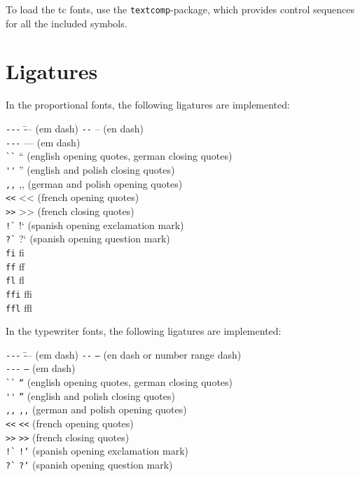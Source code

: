 \documentclass{article}
\renewcommand{\-}{\discretionary{\char'0177 }{}{}}
\begin{document}
To load the \textsf{tc} fonts, use the \texttt{textcomp}-package, which 
provides control sequences for all the included symbols.

\section{Ligatures}
In the proportional fonts, the following ligatures are implemented:\\
\begin{tabbing}
\verb:---: \=--- (em dash) \kill
\verb:--:  \>-- (en dash)\\
\verb:---: \>--- (em dash)\\
\verb:``:  \>`` (english opening quotes, german closing quotes)\\
\verb:'':  \>'' (english and polish closing quotes)\\
\verb:,,:  \>,, (german and polish opening quotes)\\
\verb:<<:  \><< (french opening quotes)\\
\verb:>>:  \>>> (french closing quotes)\\
\verb:!`:  \>!` (spanish opening exclamation mark)\\
\verb:?`:  \>?` (spanish opening question mark)\\
\verb:fi:  \>fi\\
\verb:ff:  \>ff\\
\verb:fl:  \>fl\\
\verb:ffi: \>ffi\\
\verb:ffl: \>ffl
\end{tabbing}

In the typewriter fonts, the following ligatures are implemented:
\begin{tabbing}
\verb:---: \=--- (em dash) \kill
\verb:--:  \>\texttt{--} (en dash or number range dash)\\
\verb:---: \>\texttt{---} (em dash)\\
\verb:``:  \>\texttt{``} (english opening quotes, german closing quotes)\\
\verb:'':  \>\texttt{''} (english and polish closing quotes)\\
\verb:,,:  \>\texttt{,,} (german and polish opening quotes)\\
\verb:<<:  \>\texttt{<<} (french opening quotes)\\
\verb:>>:  \>\texttt{>>} (french closing quotes)\\
\verb:!`:  \>\texttt{!`} (spanish opening exclamation mark)\\
\verb:?`:  \>\texttt{?`} (spanish opening question mark)
\end{tabbing}
\end{document}
